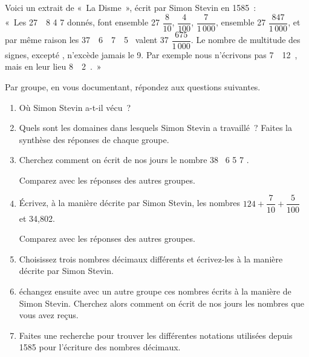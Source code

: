 
\begin{TP}[]
Voici un extrait de « La Disme », écrit par Simon Stevin en 1585 : \\[0.3em]

« Les 27  8  4  7  donnés, font ensemble 27 $\dfrac{8}{10}$, $\dfrac{4}{100}$, $\dfrac{7}{1\,000}$, ensemble 27 $\dfrac{847}{1\,000}$, et par même raison les 37  6  7  5  valent 37 $\dfrac{675}{1\,000}$. Le nombre de multitude des signes, excepté , n'excède jamais le 9. Par exemple nous n'écrivons pas 7  12 , mais en leur lieu 8  2 . »


Par groupe, en vous documentant, répondez aux questions suivantes.
\begin{enumerate}
 \item Où Simon Stevin a-t-il vécu ?
 \item Quels sont les domaines dans lesquels Simon Stevin a travaillé ? Faites la synthèse des réponses de chaque groupe.


\item Cherchez comment on écrit de nos jours le nombre 38  6  5  7 ­.

Comparez avec les réponses des autres groupes.

\item Écrivez, à la manière décrite par Simon Stevin, les nombres $124 + \dfrac{7}{10} + \dfrac{5}{100}$ et 34,802.

Comparez avec les réponses des autres groupes.

 \item Choisissez trois nombres décimaux différents et écrivez-les à la manière décrite par Simon Stevin.
 \item échangez ensuite avec un autre groupe ces nombres écrits à la manière de Simon Stevin. Cherchez alors comment on écrit de nos jours les nombres que vous avez reçus.
 \item Faites une recherche pour trouver les différentes notations utilisées depuis 1585 pour l'écriture des nombres décimaux.
 \end{enumerate}
\end{TP}


